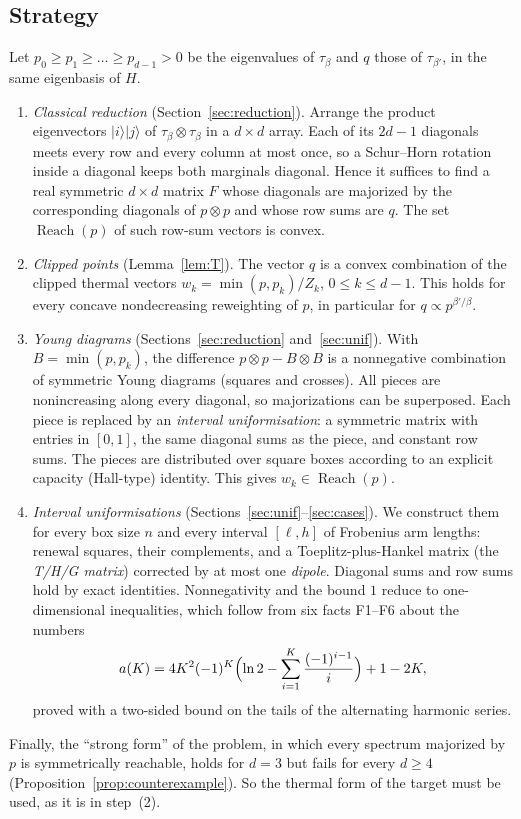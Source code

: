 \documentclass[11pt]{amsart}
\theoremstyle{definition}
\theoremstyle{remark}
\numberwithin{equation}{section}
\newcommand{\Reach}{\operatorname{Reach}}
\begin{document}
\subsection{Strategy}
Let $p_0\ge p_1\ge\dots\ge p_{d-1}>0$ be the eigenvalues of $\tau_\beta$ and $q$ those of
$\tau_{\beta'}$, in the same eigenbasis of $H$.
\begin{enumerate}
\item \emph{Classical reduction} (Section~\ref{sec:reduction}). Arrange the product eigenvectors
$|i\rangle|j\rangle$ of $\tau_\beta\otimes\tau_\beta$ in a $d\times d$ array. Each of its $2d-1$
diagonals meets every row and every column at most once, so a Schur--Horn rotation inside a diagonal
keeps both marginals diagonal. Hence it suffices to find a real symmetric $d\times d$ matrix $F$
whose diagonals are majorized by the corresponding diagonals of $p\otimes p$ and whose row sums are
$q$. The set $\Reach(p)$ of such row-sum vectors is convex.
\item \emph{Clipped points} (Lemma~\ref{lem:T}). The vector $q$ is a convex combination of the
clipped thermal vectors $w_k=\min(p,p_k)/Z_k$, $0\le k\le d-1$. This holds for every concave
nondecreasing reweighting of $p$, in particular for $q\propto p^{\beta'/\beta}$.
\item \emph{Young diagrams} (Sections~\ref{sec:reduction} and~\ref{sec:unif}). With
$B=\min(p,p_k)$, the difference $p\otimes p-B\otimes B$ is a nonnegative combination of symmetric Young
diagrams (squares and crosses). All pieces are nonincreasing along every diagonal, so majorizations
can be superposed. Each piece is replaced by an \emph{interval uniformisation}: a symmetric matrix
with entries in $[0,1]$, the same diagonal sums as the piece, and constant row sums. The pieces are
distributed over square boxes according to an explicit capacity (Hall-type) identity. This gives
$w_k\in\Reach(p)$.
\item \emph{Interval uniformisations} (Sections~\ref{sec:unif}--\ref{sec:cases}). We construct them
for every box size $n$ and every interval $[\ell,h]$ of Frobenius arm lengths: renewal squares, their
complements, and a Toeplitz-plus-Hankel matrix (the \emph{T/H/G matrix}) corrected by at most one
\emph{dipole}. Diagonal sums and row sums hold by exact identities. Nonnegativity and the bound $1$
reduce to one-dimensional inequalities, which follow from six facts F1--F6 about the numbers
\[
  a(K)=4K^2(-1)^K\Bigl(\ln 2-\sum_{i=1}^{K}\frac{(-1)^{i-1}}{i}\Bigr)+1-2K ,
\]
proved with a two-sided bound on the tails of the alternating harmonic series.
\end{enumerate}
Finally, the ``strong form'' of the problem, in which every spectrum majorized by $p$ is
symmetrically reachable, holds for $d=3$ \cite[Thm.~1]{BakhshinezhadEtAl2019} but fails for every
$d\ge4$ (Proposition~\ref{prop:counterexample}). So the thermal form of the target must be used, as it
is in step~(2).
\end{document}
